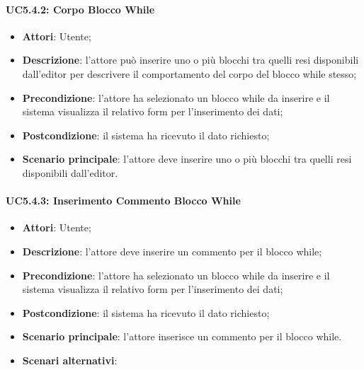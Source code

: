 \paragraph{UC5.4.2: Corpo Blocco While}
\label{UC5.4.2}
\begin{itemize}
\item \textbf{Attori}: Utente;
\item \textbf{Descrizione}: l'attore può inserire uno o più blocchi tra quelli resi disponibili dall'editor per descrivere il comportamento del corpo del blocco while stesso;	
\item \textbf{Precondizione}: l'attore ha selezionato un blocco while da inserire e il sistema visualizza il relativo form per l'inserimento dei dati;	
\item \textbf{Postcondizione}: il sistema ha ricevuto il dato richiesto;	
\item \textbf{Scenario principale}:
l'attore deve inserire uno o più blocchi tra quelli resi disponibili dall'editor.	
\end{itemize}

\paragraph{UC5.4.3: Inserimento Commento Blocco While	}
\label{UC5.4.3}
\begin{itemize}
\item \textbf{Attori}: Utente;
\item \textbf{Descrizione}: l'attore deve inserire un commento per il blocco while;	
\item \textbf{Precondizione}: l'attore ha selezionato un blocco while da inserire e il sistema visualizza il relativo form per l'inserimento dei dati;	
\item \textbf{Postcondizione}: il sistema ha ricevuto il dato richiesto;	
\item \textbf{Scenario principale}:
l'attore inserisce un commento per il blocco while.
\item \textbf{Scenari alternativi}:
	

\end{itemize}

